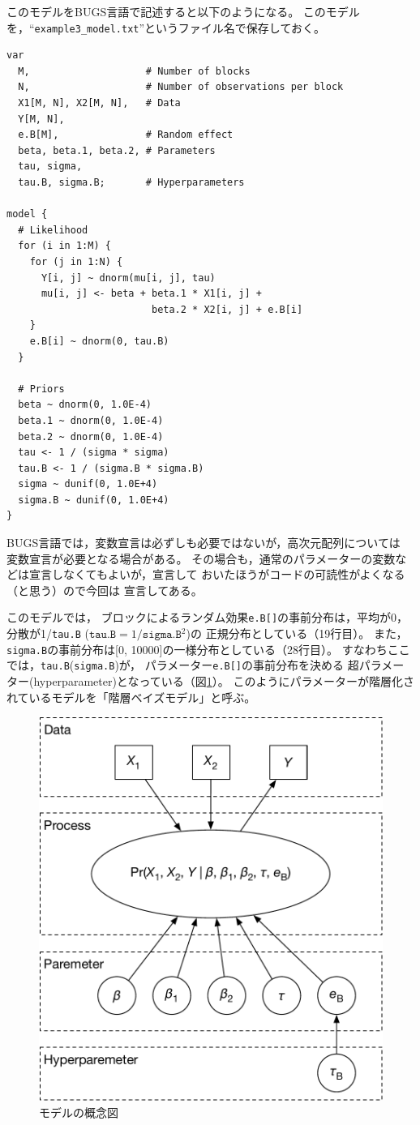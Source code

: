 \documentclass[11pt,uplatex]{jsarticle}
\begin{document}
このモデルをBUGS言語で記述すると以下のようになる。
このモデルを，``\texttt{example3\_model.txt}''というファイル名で保存しておく。

\begin{lstlisting}
var
  M,                    # Number of blocks
  N,                    # Number of observations per block
  X1[M, N], X2[M, N],   # Data
  Y[M, N],
  e.B[M],               # Random effect
  beta, beta.1, beta.2, # Parameters
  tau, sigma, 
  tau.B, sigma.B;       # Hyperparameters

model {
  # Likelihood
  for (i in 1:M) {
    for (j in 1:N) {
      Y[i, j] ~ dnorm(mu[i, j], tau)
      mu[i, j] <- beta + beta.1 * X1[i, j] +
                         beta.2 * X2[i, j] + e.B[i]
    }
    e.B[i] ~ dnorm(0, tau.B)
  }

  # Priors
  beta ~ dnorm(0, 1.0E-4)
  beta.1 ~ dnorm(0, 1.0E-4)
  beta.2 ~ dnorm(0, 1.0E-4)
  tau <- 1 / (sigma * sigma)
  tau.B <- 1 / (sigma.B * sigma.B)
  sigma ~ dunif(0, 1.0E+4)
  sigma.B ~ dunif(0, 1.0E+4)
}
\end{lstlisting}

BUGS言語では，変数宣言は必ずしも必要ではないが，高次元配列については
変数宣言が必要となる場合がある。
その場合も，通常のパラメーターの変数などは宣言しなくてもよいが，宣言して
おいたほうがコードの可読性がよくなる（と思う）ので今回は
宣言してある。

このモデルでは，
ブロックによるランダム効果\texttt{e.B[]}の事前分布は，平均が0，分散が1/\texttt{tau.B}
($\texttt{tau.B}=1/\texttt{sigma.B}^{2}$)の
正規分布としている（19行目）。
また，\texttt{sigma.B}の事前分布は[0, 10000]の一様分布としている（28行目）。
すなわちここでは，\texttt{tau.B}(\texttt{sigma.B})が，
パラメーター\texttt{e.B[]}の事前分布を決める
超パラメーター(hyperparameter)となっている（図\ref{example3_schema}）。
このようにパラメーターが階層化されているモデルを「階層ベイズモデル」と呼ぶ。

\begin{figure}[htbp]
	\begin{center}
		\includegraphics[bb=0 0 422 472, clip, width=280 bp]{example3_schema.pdf}
	\end{center}
	\caption{モデルの概念図}
	\label{example3_schema}
\end{figure}
\end{document}
